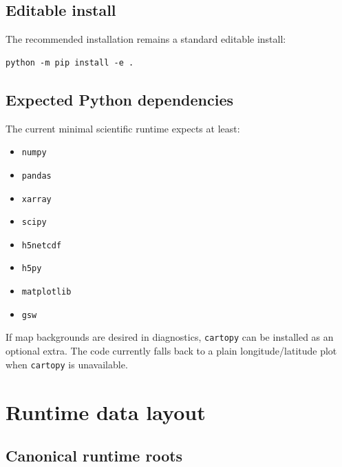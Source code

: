 \documentclass[11pt,a4paper]{article}
\newcommand{\pkg}[1]{\texttt{#1}}
\begin{document}
\subsection{Editable install}

The recommended installation remains a standard editable install:

\begin{lstlisting}[style=meopcode]
python -m pip install -e .
\end{lstlisting}

\subsection{Expected Python dependencies}

The current minimal scientific runtime expects at least:

\begin{itemize}[leftmargin=1.5em]
  \item \pkg{numpy}
  \item \pkg{pandas}
  \item \pkg{xarray}
  \item \pkg{scipy}
  \item \pkg{h5netcdf}
  \item \pkg{h5py}
  \item \pkg{matplotlib}
  \item \pkg{gsw}
\end{itemize}

If map backgrounds are desired in diagnostics, \pkg{cartopy} can be installed as an optional extra. The code currently falls back to a plain longitude/latitude plot when \pkg{cartopy} is unavailable.

\section{Runtime data layout}

\subsection{Canonical runtime roots}
\end{document}
